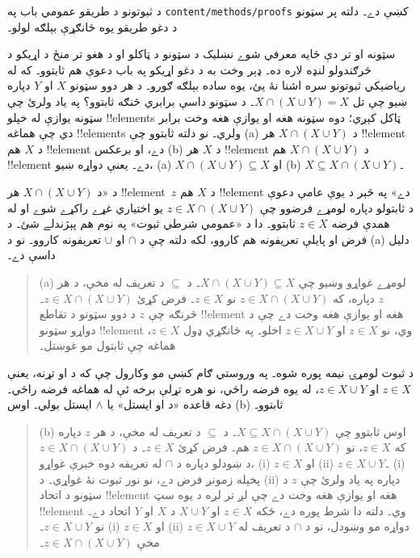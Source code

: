 \documentclass[../../../include/open-logic-section]{subfiles}
\begin{document}

\begin{editorial}
د ثبوتونو د طريقو عمومي باب په \verb|content/methods/proofs| کښې دے۔ دلته پر سټونو د دغو طريقو يوه ځانګړې بېلګه لولو۔
\end{editorial}

\begin{explain}
سټونه او تر دې ځايه معرفي شوے نښليک د سټونو د ټاکلو او د هغو تر منځ د اړيکو د څرګندولو لنډه لاره ده۔ ډېر وخت به د دغو اړيکو په باب دعوې هم ثابتوو۔ که له رياضيکي ثبوتونو سره اشنا نۀ يئ، يوه ساده بېلګه ګورو۔ د هر دوو سټونو $X$ او $Y$ دپاره ښيو چې تل $X \cap
(X \cup Y) = X$۔ د سټونو داسې برابري څنګه ثابتوو؟ په ياد ولرئ چې سټونه يوازې له خپلو !!{element}s ټاکل کېږي؛ دوه سټونه هغه او يوازې هغه وخت برابر دي چې هماغه !!{element}s ولري۔ نو دلته ثابتوو چې (a) د $X \cap (X \cup
Y)$ هر !!{element} د $X$ هم !!{element} دے، او برعکس (b) د $X$ هر !!{element} د $X \cap (X \cup Y)$ هم !!{element} دے۔ يعنې دواړه ښيو، (a) $X \cap (X \cup Y) \subseteq X$ او (b) $X \subseteq X \cap (X \cup Y)$۔

د «د $X \cap (X
\cup Y)$ هر !!{element}~$z$ د $X$ هم !!{element} دے» په څېر د يوې عامې دعوې د ثابتولو دپاره لومړے فرضوو چې $z \in X \cap (X \cup Y)$ يو اختياري غړے راکړے شوے او له همدې فرضه $z \in X$ ثابتوو۔ دا د «عمومي شرطي ثبوت» په نوم هم پېژندلے شئ۔ د فرض او پايلې تعريفونه هم کاروو، لکه دلته چې د $\cap$ او $\cup$ تعريفونه کاروو۔ نو د (a) دليل داسې دے۔

\begin{quote}
(a) لومړے غواړو وښيو چې $X \cap (X \cup Y) \subseteq X$۔ د $\subseteq$ د تعريف له مخې، د هر $z$ دپاره، که $z \in X \cap (X \cup Y)$ نو $z \in X$۔ فرض کړئ $z \in X \cap (X \cup
Y)$۔ څرنګه چې $z$ د دوو سټونو د تقاطع !!{element} هغه او يوازې هغه وخت دے چې د دواړو سټونو !!{element} وي، نو $z \in X$ او $z \in X \cup Y$ اخلو۔ په ځانګړي ډول $z \in X$، هماغه چې ثابتول مو غوښتل۔
\end{quote}

د ثبوت لومړۍ نيمه پوره شوه۔ په وروستي ګام کښې مو وکارول چې که د او تړنه، يعنې $z \in X$ او $z \in X
\cup Y$، له يوه فرضه راځي، نو هره تړلې برخه ئې له هماغه فرضه راځي۔ دغه قاعده «د او ايستل» يا $\land$ ايستل بولي۔ اوس (b) ثابتوو۔

\begin{quote}
(b) اوس ثابتوو چې $X \subseteq X \cap (X \cup Y)$۔ د $\subseteq$ د تعريف له مخې، د هر $z$ دپاره که $z \in X$، نو $z \in X \cap
(X \cup Y)$ هم۔ فرض کړئ $z \in X$۔ د $z \in X
\cap (X \cup Y)$ د ښودلو دپاره د $\cap$ له تعريفه دوه خبرې غواړو، (i) $z \in X$ او (ii) $z \in X \cup Y$۔ (i) پخپله زمونږ فرض دے، نو نور ثبوت نۀ غواړي۔ د (ii) دپاره په ياد ولرئ چې $z$ د سټونو د اتحاد !!{element} هغه او يوازې هغه وخت دے چې لږ تر لږه د يوه سټ !!{element} وي۔ دلته دا شرط پوره دے، ځکه $z \in X$ او $X \cup Y$ د $X$ او $Y$ اتحاد دے۔ نو $z \in X \cup Y$۔ (i) $z \in X$ او (ii) $z \in X \cup Y$ دواړه مو وښودل، نو د $\cap$ د تعريف له مخې $z \in X \cap (X \cup Y)$۔
\end{quote}


\end{explain}
\end{document}
